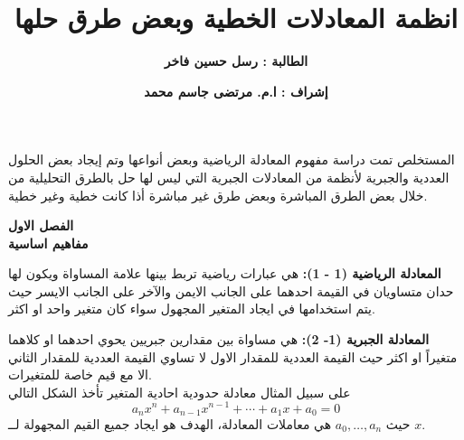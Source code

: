 

\newcommand{\sen}[1]{\en{\textsuperscript{#1}}}
\title{\textbf{انظمة المعادلات الخطية وبعض طرق حلها}}
\author{\textbf{الطالبة : رسل حسين فاخر}}
\date{\textbf{إشراف : ا.م. مرتضى جاسم محمد}}


\renewcommand{\theequation}{1-\arabic{equation}}
\abovedisplayskip=0pt
\belowdisplayskip=0pt
	\maketitle
	\timesfont
	
	\begin{frame}{المستخلص}
		تمت دراسة مفهوم المعادلة الرياضية وبعض أنواعها وتم إيجاد بعض الحلول العددية والجبرية لأنظمة من المعادلات الجبرية التي ليس لها حل بالطرق التحليلية من خلال بعض الطرق المباشرة وبعض طرق غير مباشرة أذا كانت خطية وغير خطية.
	\end{frame}
	
	\begin{frame}
		\begin{center}
			\Huge
			\textbf{الفصل الاول}\\
			\textbf{مفاهيم اساسية}
		\end{center}
	\end{frame}
	
	\begin{frame}
		\begin{exampleblock}{	\textbf{المعادلة الرياضية (1 - 1)\sen{\cite{odesolapp}}:}}
			هي عبارات رياضية تربط بينها علامة المساواة ويكون لها حدان متساويان في القيمة احدهما على الجانب الايمن والآخر على الجانب الايسر حيث يتم استخدامها في ايجاد المتغير المجهول سواء كان متغير واحد او اكثر.
		\end{exampleblock}
		
		\begin{exampleblock}{\textbf{المعادلة الجبرية (1- 2)\sen{\cite{odesolapp}}:}}
			هي مساواة بين مقدارين جبريين يحوي احدهما او كلاهما متغيراً او اكثر حيث القيمة العددية للمقدار الاول لا تساوي القيمة العددية للمقدار الثاني الا مع قيم خاصة للمتغيرات.\\
			على سبيل المثال معادلة حدودية احادية المتغير تأخذ الشكل التالي
			\[
			a_n x^n + a_{n-1}x^{n-1} + \cdots + a_1 x + a_0 = 0
			\]
			حيث $a_0, \dots, a_n$ هي معاملات المعادلة، الهدف هو ايجاد جميع القيم المجهولة لــ $x$.
		\end{exampleblock}
	\end{frame}
	
